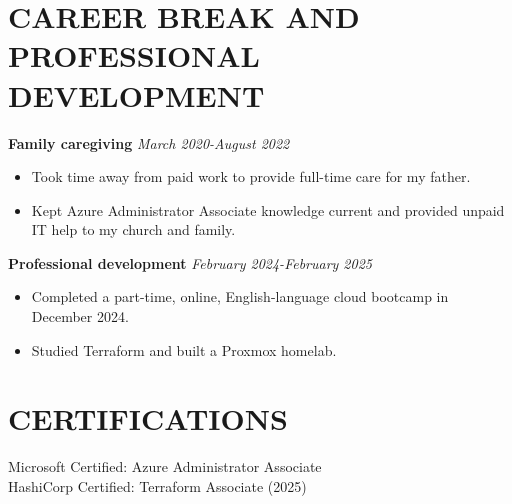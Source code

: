 \documentclass[11pt,a4paper]{article}
\begin{document}
\section*{CAREER BREAK AND PROFESSIONAL DEVELOPMENT}
\textbf{Family caregiving} \hfill \textit{March 2020-August 2022}
\begin{itemize}
\item Took time away from paid work to provide full-time care for my father.
\item Kept Azure Administrator Associate knowledge current and provided unpaid IT help to my church and family.
\end{itemize}

\textbf{Professional development} \hfill \textit{February 2024-February 2025}
\begin{itemize}
\item Completed a part-time, online, English-language cloud bootcamp in December 2024.
\item Studied Terraform and built a Proxmox homelab.
\end{itemize}

\section*{CERTIFICATIONS}
Microsoft Certified: Azure Administrator Associate\\
HashiCorp Certified: Terraform Associate (2025)
\end{document}
